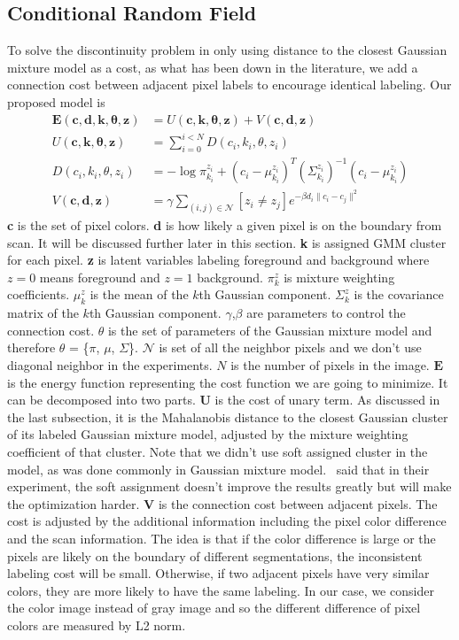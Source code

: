 \documentclass{article} %
\begin{document}
\subsection{Conditional Random Field}
To solve the discontinuity problem in only using distance to the
closest Gaussian mixture model as a cost, as what has been down in the
literature, we add a connection cost between adjacent pixel labels to
encourage identical labeling. Our proposed model is
\begin{align}
\mathbf{E}(\mathbf{c}, \mathbf{d},\mathbf{k}, \mathbf{\theta},
\mathbf{z}) &= U(\mathbf{c},\mathbf{k}, \mathbf{\theta}, \mathbf{z}) +
V(\mathbf{c}, \mathbf{d}, \mathbf{z}) \\
U(\mathbf{c},\mathbf{k}, \mathbf{\theta}, \mathbf{z}) &=
\sum_{i=0}^{i<N} D(c_i, k_i, \theta, z_i) \\
D(c_i, k_i, \theta, z_i) &= -\log \pi_{k_i}^{z_i} + (c_i -
\mu_{k_i}^{z_i})^T (\Sigma_{k_i}^{z_i})^{-1} (c_i - \mu_{k_i}^{z_i})
\\
V(\mathbf{c}, \mathbf{d}, \mathbf{z}) &= \gamma \sum_{(i, j) \in
  \mathcal{N}} [z_i \not = z_j] e^{ -\beta d_i \| c_i - c_j\|^2}
\end{align}
\textbf{c} is the set of pixel colors.
\textbf{d} is  how likely a given pixel is on the boundary from
scan. It will be discussed further later in this section.
\textbf{k} is assigned GMM cluster for each pixel.
\textbf{z} is latent variables labeling foreground and background where $z=0$ means foreground and $z=1$ background.
$\pi_k^z$ is mixture weighting coefficients.
$\mu_k^z$ is the mean of the $k$th Gaussian component.
$\Sigma_k^z$ is the covariance matrix of the $k$th Gaussian component.
$\gamma$,$\beta$ are parameters to control the connection cost.
$\theta$ is the set of parameters of the Gaussian mixture model and
therefore $\theta$ = \{$\pi$, $\mu$, $\Sigma$\}.
$\mathcal{N}$ is set of all the neighbor pixels and we don't use
diagonal neighbor in the experiments. $N$ is the number of pixels in
the image. $\mathbf{E}$ is the energy function representing the cost function we
are going to minimize. It can be decomposed into two
parts. $\mathbf{U}$ is the cost of unary term. As discussed in the
last subsection, it is the Mahalanobis distance to the closest
Gaussian cluster of its labeled Gaussian mixture model, adjusted by
the mixture weighting coefficient of that cluster. Note that we didn't
use soft assigned cluster in the model, as was done commonly in
Gaussian mixture model.~\citet{Rother2004GrabCut} said that in their
experiment, the soft assignment doesn't improve the results greatly
but will make the optimization harder. $\mathbf{V}$ is the connection
cost between adjacent pixels. The cost is adjusted by the additional
information including the pixel color difference and the scan
information. The idea is that if the color difference is large or the
pixels are likely on the boundary of different segmentations, the
inconsistent labeling cost will be small. Otherwise, if two adjacent
pixels have very similar colors, they are more likely to have the same
labeling. In our case, we consider the color image instead of gray
image and so the different difference of pixel colors are measured by
L2 norm.
\end{document}
